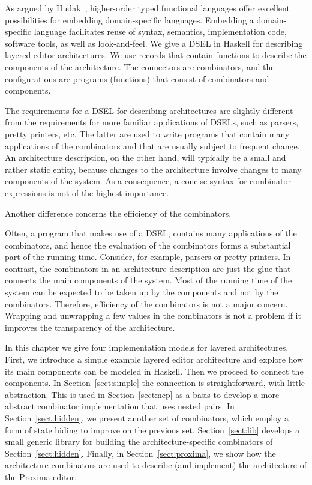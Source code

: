 As argued by Hudak~\cite{hudak98DSLs}, higher-order typed functional languages offer excellent possibilities for embedding domain-specific languages. Embedding a domain-specific language facilitates reuse of syntax, semantics, implementation code, software tools, as well as look-and-feel. We give a DSEL in Haskell for describing layered editor architectures. We use records that contain functions to describe the components of the architecture. The connectors are combinators, and the configurations are programs (functions) that consist of combinators and components. 

\bc
The requirements for a DSEL for describing architectures are slightly different from the requirements for more familiar applications of DSELs, such as parsers, pretty printers, etc. The latter are used to write programs that contain many applications of the combinators and that are usually subject to frequent change. An architecture description, on the other hand, will typically be a small and rather static entity, because changes to the architecture involve changes to many components of the system.  As a consequence, a concise syntax for combinator expressions is not of the highest importance.
\ec

\bc Another difference concerns the efficiency of the combinators.\ec 

Often, a program that makes use of a DSEL, contains many applications of the combinators, and hence the evaluation of the combinators forms a substantial part of the running time. Consider, for example, parsers or pretty printers. In contrast, the combinators in an architecture description are just the glue that connects the main components of the system. Most of the running time of the system can be expected to be taken up by the components and not by the combinators. Therefore, efficiency of the combinators is not a major concern. Wrapping and unwrapping a few values in the combinators is not a problem if it improves the transparency of the architecture.

In this chapter we give four implementation models for layered architectures. First, we introduce a simple example layered editor architecture and explore how its main components can be modeled in Haskell. Then we proceed to connect the components. In Section~\ref{sect:simple} the connection is straightforward, with little abstraction. This is used in Section~\ref{sect:ncp} as a basis to develop a more abstract combinator implementation that uses nested pairs. In Section~\ref{sect:hidden}, we present another set of combinators, which employ a form of state hiding to improve on the previous set. Section~\ref{sect:lib} develops a small generic library for building the architecture-specific combinators of Section~\ref{sect:hidden}. Finally, in Section~\ref{sect:proxima}, we show how the architecture combinators are used to describe (and implement) the architecture of  the Proxima editor.%




